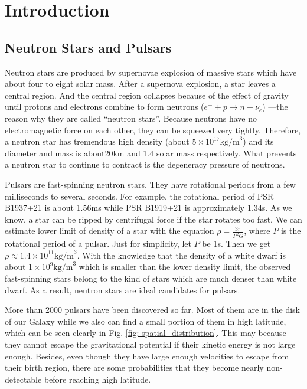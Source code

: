 \documentclass[12pt]{report}
\begin{document}
\listoftables


\chapter{Introduction}   	   
  \section{Neutron Stars and Pulsars}
    Neutron stars are produced by supernovae explosion of massive stars which have about four 
    to eight solar mass. After a supernova explosion, a star leaves a central region. 
    And the central region collapses because of the effect of 
    gravity until protons and electrons combine to form neutrons 
    ($e^{-}+p\rightarrow n+\nu_{e}$) ---the reason why they are called ``neutron stars''.  
    Because neutrons have no electromagnetic force on each other, they can be squeezed very 
    tightly. Therefore, a neutron star has tremendous high density 
    (about $5\times 10^{17} \mbox{kg/m}^3$) and its diameter and mass is about20km and 
    1.4 solar mass respectively. What
    prevents a neutron star to continue to contract is the degeneracy pressure of neutrons. 
    
    Pulsars are fast-spinning neutron stars. They have rotational periods from a few 
    milliseconds to several seconds. For example, the rotational period of PSR B1937+21 is 
    about 1.56ms while PSR B1919+21 is approximately 1.34s. As we know, a star can be ripped 
    by centrifugal force if the star rotates too fast. We can estimate lower limit of 
    density of a star with the equation $\rho=\frac{3\pi}{P^2G}$, where $P$ is the 
    rotational period of a pulsar. Just for simplicity, let $P$ be 1s. Then we 
    get $\rho\approx 1.4\times 10^{11}\mbox{kg/m}^3$. With the knowledge that the 
    density of a white dwarf is about $1\times 10^9\mbox{kg/m}^3$ which is smaller than 
    the lower density limit, the observed fast-spinning stars belong to the kind of stars 
    which are much denser than white dwarf. As a result, neutron stars are ideal candidates 
    for pulsars. 
    
    More than 2000 pulsars have been discovered so far. Most of them are in the disk of 
    our Galaxy while we also can find a small portion of them in high latitude, which can be 
    seen clearly in Fig. \ref{fig: spatial_distribution}. This may 
    because they cannot escape the gravitational potential if their kinetic energy is not 
    large enough. Besides, even though they have large enough velocities to escape from their 
    birth region, there are some probabilities that they become nearly non-detectable before 
    reaching high latitude. 
\end{document}
